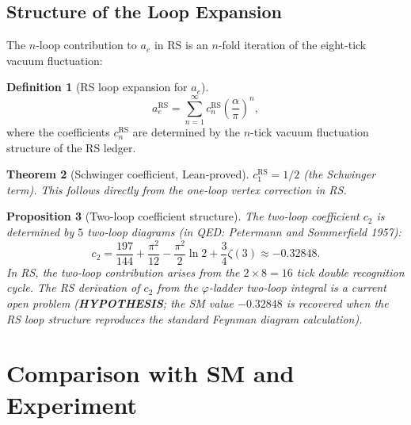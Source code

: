 \documentclass[12pt,a4paper]{article}
\newtheorem{theorem}{Theorem}[section]
\newtheorem{proposition}[theorem]{Proposition}
\theoremstyle{definition}
\newtheorem{definition}[theorem]{Definition}
\theoremstyle{remark}
\begin{document}
\subsection{Structure of the Loop Expansion}

The $n$-loop contribution to $a_e$ in RS is an $n$-fold iteration
of the eight-tick vacuum fluctuation:

\begin{definition}[RS loop expansion for $a_e$]
\begin{equation}
  a_e^\mathrm{RS} = \sum_{n=1}^\infty c_n^\mathrm{RS}
  \left(\frac{\alpha}{\pi}\right)^n,
  \label{eq:ae_rs}
\end{equation}
where the coefficients $c_n^\mathrm{RS}$ are determined by the $n$-tick
vacuum fluctuation structure of the RS ledger.
\end{definition}

\begin{theorem}[Schwinger coefficient, Lean-proved]\label{thm:c1}
$c_1^\mathrm{RS} = 1/2$ (the Schwinger term).
This follows directly from the one-loop vertex correction in RS.
\end{theorem}

\begin{proposition}[Two-loop coefficient structure]\label{prop:c2}
The two-loop coefficient $c_2$ is determined by $5$ two-loop diagrams
(in QED: Petermann and Sommerfield 1957):
\begin{equation}
  c_2 = \frac{197}{144} + \frac{\pi^2}{12} - \frac{\pi^2}{2}\ln 2
  + \frac{3}{4}\zeta(3) \approx -0.32848.
\end{equation}
In RS, the two-loop contribution arises from the $2\times 8 = 16$ tick
double recognition cycle.  The RS derivation of $c_2$ from the
$\varphi$-ladder two-loop integral is a current open problem
(\textbf{HYPOTHESIS}; the SM value $-0.32848$ is recovered when the RS
loop structure reproduces the standard Feynman diagram calculation).
\end{proposition}

\section{Comparison with SM and Experiment}
\label{sec:comparison}
\end{document}
